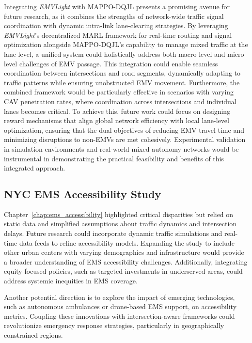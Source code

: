 Integrating \textit{\textit{EMVLight}} with MAPPO-DQJL presents a promising avenue for future research, as it combines the strengths of network-wide traffic signal coordination with dynamic intra-link lane-clearing strategies. By leveraging \textit{\textit{EMVLight}}'s decentralized MARL framework for real-time routing and signal optimization alongside MAPPO-DQJL's capability to manage mixed traffic at the lane level, a unified system could holistically address both macro-level and micro-level challenges of EMV passage. This integration could enable seamless coordination between intersections and road segments, dynamically adapting to traffic patterns while ensuring unobstructed EMV movement. Furthermore, the combined framework would be particularly effective in scenarios with varying CAV penetration rates, where coordination across intersections and individual lanes becomes critical. To achieve this, future work could focus on designing reward mechanisms that align global network efficiency with local lane-level optimization, ensuring that the dual objectives of reducing EMV travel time and minimizing disruptions to non-EMVs are met cohesively. Experimental validation in simulation environments and real-world mixed autonomy networks would be instrumental in demonstrating the practical feasibility and benefits of this integrated approach.

\subsection{NYC EMS Accessibility Study}
Chapter~\ref{chap:ems_accessibility} highlighted critical disparities but relied on static data and simplified assumptions about traffic dynamics and intersection delays. Future research could incorporate dynamic traffic simulations and real-time data feeds to refine accessibility models. Expanding the study to include other urban centers with varying demographics and infrastructure would provide a broader understanding of EMS accessibility challenges. Additionally, integrating equity-focused policies, such as targeted investments in underserved areas, could address systemic inequities in EMS coverage.

Another potential direction is to explore the impact of emerging technologies, such as autonomous ambulances or drone-based EMS support, on accessibility metrics. Coupling these innovations with intersection-aware frameworks could revolutionize emergency response strategies, particularly in geographically constrained regions.

